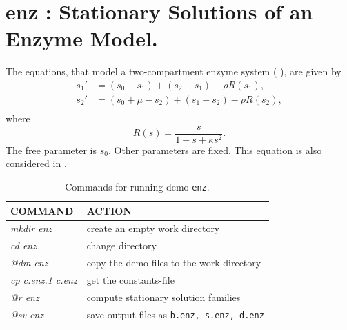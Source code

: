 \documentclass[12pt]{report}
\begin{document}
\section{ enz : Stationary Solutions of an Enzyme Model.} \label{sec:Demos_enz}
The equations, that model a two-compartment enzyme system 
( \citeyear{JPK:80}),
are given by
\begin{equation} \label{2'} \begin{array}{cl}
 s_1 '&=
 (s_0 - s_1) + (s_2 - s_1) - \rho R (s_1), \\
 s_2 '&=
 (s_0 +\mu - s_2) + (s_1 - s_2) - \rho R (s_2), \\\end{array} \end{equation}
where
$$ R (s)=\frac{s}{1+s+ \kappa s^{2} }.$$
The free parameter is $s_0$. Other parameters are fixed.
This equation is also considered in 
 \citeyear{DoKeKe:91a}.

\begin{table}[htbp]
\begin{center}
\begin{tabular}{| l | l |}
\hline
  COMMAND  & ACTION \\
\hline
  {\it mkdir enz} & create an empty work directory \\ 
  {\it cd enz} & change directory \\
  {\it @dm enz} & copy the demo files to the work directory \\
\hline
  {\it cp c.enz.1 c.enz} & get the constants-file \\ 
  {\it @r enz} & compute stationary solution families \\ 
  {\it @sv enz} & save output-files as {\tt b.enz, s.enz, d.enz} \\ 
\hline
\end{tabular}
\caption{Commands for running demo {\tt enz}.}
\label{tbl:demo_enz}
\end{center}
\end{table}

\newpage
\end{document}
